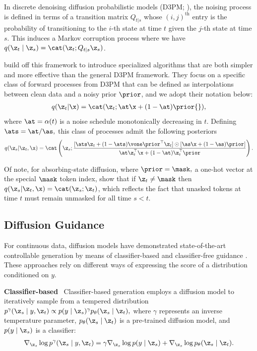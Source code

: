 \documentclass{article} %
\begin{document}
In discrete denoising diffusion probabilistic models (D3PM; \citet{austin2021structured}), the noising process is defined in terms
of a transition matrix $Q_{t|s}$ 
whose $(i,j)^{\text{th}}$ entry is the probability of transitioning to the $i$-th state at time $t$ given the $j$-th state at time $s$.
This induces a Markov corruption process where we have $q(\z_t \mid \z_s) = \cat(\z_t; Q_{t|s}\z_s)$.

\citet{sahoo2024simple} build off this framework to introduce specialized algorithms that are both simpler and more effective than the general D3PM framework.
They focus on a specific class of forward processes from D3PM that can be defined as interpolations between clean data and a noisy prior $\prior$, and we adopt their notation below:
\begin{align}\label{eq:interpolating_forward}
    q(\z_t | \x) = \cat(\z_t; \at \x + (1 - \at) \prior{}),
\end{align}
where $\at = \alpha(t)$ is a noise schedule monotonically decreasing in $t.$
Defining $\ats = \at / \as,$ this class of processes admit the following posteriors
\begin{equation}\label{eq:interpolating_posterior}
    q(\z_s | \z_t, \x) = \cat \left(
        \z_s; \frac{[\ats \z_t + (1 - \ats)\vone \prior^\top \z_t]  \odot [\as \x + (1 - \as) \prior]}{
             \at \z_t^\top \x  + (1 - \at)\z_t^\top\prior} \right).
\end{equation}

Of note, for absorbing-state diffusion, where $\prior = \mask,$ a one-hot vector at the special $\mask$ token index, \cite{sahoo2024simple} show that if $\z_t \neq \mask$ then $q(\z_s | \z_t, \x) = \cat (\z_s; \z_t)$, which reflects the fact that unasked tokens at time $t$ must remain unmasked for all time $s < t$.

\subsection{Diffusion Guidance}\label{subsec:background_guidance}
For continuous data, diffusion models have demonstrated state-of-the-art controllable generation by means of classifier-based \citep{sohl2015deep, dhariwal2021agn} and classifier-free guidance \citep{nichol2021glide, ho2022classifier, saharia2022photorealistic}. These approaches rely on different ways of expressing the score of a distribution conditioned on $y$.

\textbf{Classifier-based}~
Classifier-based generation employs a diffusion model to iteratively sample from a tempered distribution $p^{\gamma}(\z_s \mid y, \z_t) \propto p(y \mid \z_s)^{\gamma}p_\theta(\z_s \mid\z_t),$ where $\gamma$ represents an inverse temperature parameter, $p_\theta(\z_s \mid\z_t)$ is a pre-trained diffusion model, and $p(y \mid \z_s)$ is a classifier:
\begin{align}\label{eq:classifier_based}
    \nabla_{\z_s} \log p^\gamma(\z_s \mid y, \z_t) = \gamma\nabla_{\z_s}\log p(y \mid \z_s) + \nabla_{\z_s}\log p_\theta(\z_s \mid \z_t).
\end{align}
\end{document}
